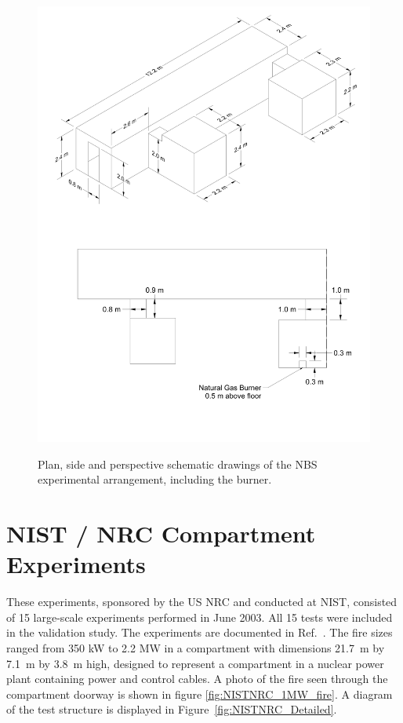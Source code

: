 \begin{figure}[\figoptions{t}]
\begin{center}
\includegraphics[width=6.5in]{FIGURES/NBS/NBS_Drawing}\\
\end{center}
\caption{Plan, side and perspective schematic drawings of the NBS experimental arrangement, including the burner.}
 \label{fig:NBS_Detailed}
\end{figure}

\section{NIST / NRC Compartment Experiments}


These experiments, sponsored by the US NRC and conducted at NIST, consisted of 15 large-scale experiments performed in June 2003. All 15 tests were included in the validation study. The experiments are documented in Ref.~\cite{Hamins:2005}. The fire sizes ranged from 350 kW to 2.2 MW in a compartment with dimensions 21.7~m by 7.1~m by 3.8~m high, designed to represent a compartment in a nuclear power plant containing power and control cables. A photo of the fire seen through the compartment doorway is shown in figure \ref{fig:NISTNRC_1MW_fire}. A diagram of the test structure is displayed in Figure~\ref{fig:NISTNRC_Detailed}.

